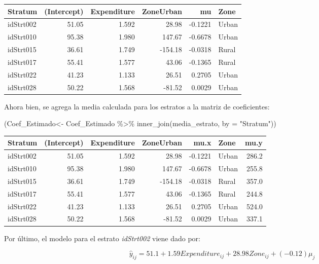 \documentclass[
  12pt,
]{book}
\newenvironment{Shaded}{\begin{snugshade}}{\end{snugshade}}
\newcommand{\AttributeTok}[1]{\textcolor[rgb]{0.77,0.63,0.00}{#1}}
\newcommand{\FunctionTok}[1]{\textcolor[rgb]{0.00,0.00,0.00}{#1}}
\newcommand{\NormalTok}[1]{#1}
\newcommand{\OtherTok}[1]{\textcolor[rgb]{0.56,0.35,0.01}{#1}}
\newcommand{\SpecialCharTok}[1]{\textcolor[rgb]{0.00,0.00,0.00}{#1}}
\newcommand{\StringTok}[1]{\textcolor[rgb]{0.31,0.60,0.02}{#1}}
\begin{document}
\begin{tabular}{l|r|r|r|r|l}
\hline
Stratum & (Intercept) & Expenditure & ZoneUrban & mu & Zone\\
\hline
idStrt002 & 51.05 & 1.592 & 28.98 & -0.1221 & Urban\\
\hline
idStrt010 & 95.38 & 1.980 & 147.67 & -0.6678 & Urban\\
\hline
idStrt015 & 36.61 & 1.749 & -154.18 & -0.0318 & Rural\\
\hline
idStrt017 & 55.41 & 1.577 & 43.06 & -0.1365 & Rural\\
\hline
idStrt022 & 41.23 & 1.133 & 26.51 & 0.2705 & Urban\\
\hline
idStrt028 & 50.22 & 1.568 & -81.52 & 0.0029 & Urban\\
\hline
\end{tabular}

Ahora bien, se agrega la media calculada para los estratos a la matriz de coeficientes:

\begin{Shaded}
\begin{Highlighting}[]
\NormalTok{(Coef\_Estimado}\OtherTok{\textless{}{-}}\NormalTok{ Coef\_Estimado }\SpecialCharTok{\%\textgreater{}\%}  \FunctionTok{inner\_join}\NormalTok{(media\_estrato, }\AttributeTok{by =} \StringTok{"Stratum"}\NormalTok{))}
\end{Highlighting}
\end{Shaded}

\begin{tabular}{l|r|r|r|r|l|r}
\hline
Stratum & (Intercept) & Expenditure & ZoneUrban & mu.x & Zone & mu.y\\
\hline
idStrt002 & 51.05 & 1.592 & 28.98 & -0.1221 & Urban & 286.2\\
\hline
idStrt010 & 95.38 & 1.980 & 147.67 & -0.6678 & Urban & 255.8\\
\hline
idStrt015 & 36.61 & 1.749 & -154.18 & -0.0318 & Rural & 357.0\\
\hline
idStrt017 & 55.41 & 1.577 & 43.06 & -0.1365 & Rural & 244.8\\
\hline
idStrt022 & 41.23 & 1.133 & 26.51 & 0.2705 & Urban & 524.0\\
\hline
idStrt028 & 50.22 & 1.568 & -81.52 & 0.0029 & Urban & 337.1\\
\hline
\end{tabular}

Por último, el modelo para el estrato \emph{idStrt002} viene dado por:

\[
\hat{y}_{ij}=51.1+1.59Expenditure_{ij}+28.98Zone_{ij}+\left(-0.12\right)\mu_{j}
\]
\end{document}
